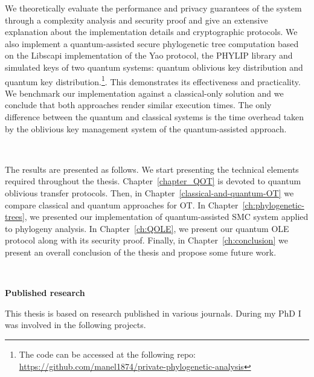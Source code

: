 We theoretically evaluate the performance and privacy guarantees of the system through a complexity analysis and security proof and give an extensive explanation about the implementation details and cryptographic protocols. We also implement a quantum-assisted secure phylogenetic tree computation based on the Libscapi implementation of the Yao protocol, the PHYLIP library and simulated keys of two quantum systems: quantum oblivious key distribution and quantum key distribution.\footnote{ The code can be accessed at the following repo: \href{https://github.com/manel1874/private-phylogenetic-analysis}{https://github.com/manel1874/private-phylogenetic-analysis}}. This demonstrates its effectiveness and practicality. We benchmark our implementation against a classical-only solution and we conclude that both approaches render similar execution times. The only difference between the quantum and classical systems is the time overhead taken by the oblivious key management system of the quantum-assisted approach.

\

The results are presented as follows. We start presenting the technical elements required throughout the thesis. Chapter~\ref{chapter_QOT} is devoted to quantum oblivious transfer protocols. Then, in Chapter~\ref{classical-and-quantum-OT} we compare classical and quantum approaches for OT. In Chapter~\ref{ch:phylogenetic-trees}, we presented our implementation of quantum-assisted SMC system applied to phylogeny analysis. In Chapter~\ref{ch:QOLE}, we present our quantum OLE protocol along with its security proof. Finally, in Chapter~\ref{ch:conclusion} we present an overall conclusion of the thesis and propose some future work.


\

\noindent\textbf{Published research}

This thesis is based on research published in various journals. During my PhD I was involved in the following projects.

